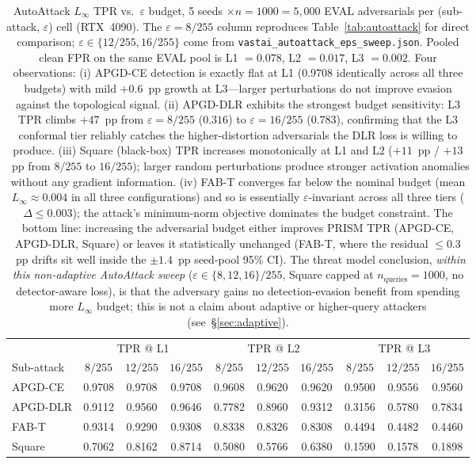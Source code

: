 \begin{table}[h]
\centering
\small
\setlength{\tabcolsep}{4pt}
\begin{tabular}{l|ccc|ccc|ccc}
\toprule
 & \multicolumn{3}{c|}{TPR @ L1} & \multicolumn{3}{c|}{TPR @ L2} & \multicolumn{3}{c}{TPR @ L3} \\
Sub-attack & $8/255$ & $12/255$ & $16/255$ & $8/255$ & $12/255$ & $16/255$ & $8/255$ & $12/255$ & $16/255$ \\
\midrule
APGD-CE  & 0.9708 & 0.9708 & 0.9708 & 0.9608 & 0.9620 & 0.9620 & 0.9500 & 0.9556 & 0.9560 \\
APGD-DLR & 0.9112 & 0.9560 & 0.9646 & 0.7782 & 0.8960 & 0.9312 & 0.3156 & 0.5780 & 0.7834 \\
FAB-T    & 0.9314 & 0.9290 & 0.9308 & 0.8338 & 0.8326 & 0.8308 & 0.4494 & 0.4482 & 0.4460 \\
Square   & 0.7062 & 0.8162 & 0.8714 & 0.5080 & 0.5766 & 0.6380 & 0.1590 & 0.1578 & 0.1898 \\
\bottomrule
\end{tabular}
\caption{AutoAttack $L_\infty$ TPR vs.\ $\varepsilon$ budget, 5 seeds
$\times n{=}1000 = 5{,}000$ EVAL adversarials per (sub-attack, $\varepsilon$) cell
(RTX~4090). The $\varepsilon{=}8/255$ column reproduces Table~\ref{tab:autoattack}
for direct comparison; $\varepsilon \in \{12/255,16/255\}$ come from
\texttt{vastai\_autoattack\_eps\_sweep.json}. Pooled clean FPR on the same EVAL
pool is L1 $=0.078$, L2 $=0.017$, L3 $=0.002$. Four observations:
(i) APGD-CE detection is exactly flat at L1 ($0.9708$ identically across all
three budgets) with mild $+0.6$~pp growth at L3---larger perturbations do
not improve evasion against the topological signal.
(ii) APGD-DLR exhibits the strongest budget sensitivity: L3 TPR climbs
$+47$~pp from $\varepsilon{=}8/255$ ($0.316$) to $\varepsilon{=}16/255$
($0.783$), confirming that the L3 conformal tier reliably catches the
higher-distortion adversarials the DLR loss is willing to produce.
(iii) Square (black-box) TPR increases monotonically at L1 and L2
($+11$~pp / $+13$~pp from $8/255$ to $16/255$); larger random perturbations
produce stronger activation anomalies without any gradient information.
(iv) FAB-T converges far below the nominal budget (mean $L_\infty \approx 0.004$
in all three configurations) and so is essentially $\varepsilon$-invariant
across all three tiers ($\Delta \le 0.003$); the attack's minimum-norm
objective dominates the budget constraint.
The bottom line: increasing the adversarial budget either improves PRISM
TPR (APGD-CE, APGD-DLR, Square) or leaves it statistically unchanged
(FAB-T, where the residual $\le 0.3$~pp drifts sit well inside the
$\pm 1.4$~pp seed-pool 95\% CI). The threat model conclusion, \emph{within this non-adaptive AutoAttack
sweep} ($\varepsilon \in \{8,12,16\}/255$, Square capped at
$n_\text{queries}{=}1000$, no detector-aware loss), is that the adversary
gains no detection-evasion benefit from spending more $L_\infty$ budget;
this is not a claim about adaptive or higher-query attackers
(see~\S\ref{sec:adaptive}).}
\label{tab:aa_eps_sweep}
\end{table}

